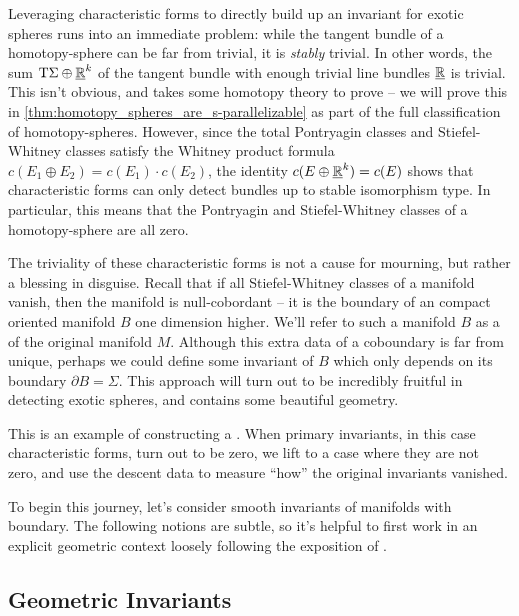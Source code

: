 Leveraging characteristic forms to directly build up an invariant for exotic spheres runs into an immediate problem: while the tangent bundle of a homotopy-sphere can be far from trivial, it is \emph{stably} trivial. In other words, the sum $\mathrm{T} \Sigma\oplus \underline{\mathbb{R}}^k$ of the tangent bundle with enough trivial line bundles $\underline{\mathbb{R}}$ is trivial. This isn't obvious, and takes some homotopy theory to prove -- we will prove this in \cref{thm:homotopy_spheres_are_s-parallelizable} as part of the full classification of homotopy-spheres. However, since the total Pontryagin classes and Stiefel-Whitney classes satisfy the Whitney product formula $c(E_1\oplus E_2)=c(E_1)\cdot c(E_2)$, the identity $c(E\oplus \underline{\mathbb{R}}^k) = c(E)$ shows that characteristic forms can only detect bundles up to stable isomorphism type. In particular, this means that the Pontryagin and Stiefel-Whitney classes of a homotopy-sphere are all zero.

The triviality of these characteristic forms is not a cause for mourning, but rather a blessing in disguise. Recall that if all Stiefel-Whitney classes of a manifold vanish, then the manifold is null-cobordant -- it is the boundary of an compact oriented manifold $B$ one dimension higher. We'll refer to such a manifold $B$ as a  of the original manifold $M$. Although this extra data of a coboundary is far from unique, perhaps we could define some invariant of $B$ which only depends on its boundary $\partial B=\Sigma$. This approach will turn out to be incredibly fruitful in detecting exotic spheres, and contains some beautiful geometry.

\begin{remark} 
  This is an example of constructing a . When primary invariants, in this case characteristic forms, turn out to be zero, we lift to a case where they are not zero, and use the descent data to measure ``how'' the original invariants vanished. 
\end{remark}

To begin this journey, let's consider smooth invariants of manifolds with boundary. The following notions are subtle, so it's helpful to first work in an explicit geometric context loosely following the exposition of \cite{witten1985global}.

\subsection{Geometric Invariants}

